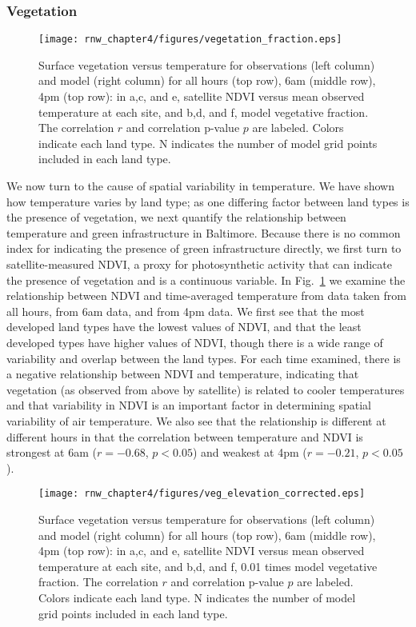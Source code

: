 \subsubsection{Vegetation}

\begin{figure}
\centering
\texttt{[image: rnw\_chapter4/figures/vegetation\_fraction.eps]}
\caption{Surface vegetation versus temperature for observations (left column) and model (right column) for all hours (top row), 6am (middle row), 4pm (top row): in a,c, and e, satellite NDVI versus mean observed temperature at each site, and b,d, and f, model vegetative fraction. The correlation $r$ and correlation p-value $p$ are labeled. Colors indicate each land type. N indicates the number of model grid points included in each land type.}
\label{fig:veg}
\end{figure}

We now turn to the cause of spatial variability in temperature. We have shown how temperature varies by land type; as one differing factor between land types is the presence of vegetation, we next quantify the relationship between temperature and green infrastructure in Baltimore. 
Because there is no common index for indicating the presence of green infrastructure directly, we first turn to satellite-measured NDVI, a proxy for photosynthetic activity that can indicate the presence of vegetation and is a continuous variable. 
In Fig.~\ref{fig:veg} we examine the relationship between NDVI and time-averaged temperature from data taken from all hours, from 6am data, and from 4pm data. We first see that the most developed land types have the lowest values of NDVI, and that the least developed types have higher values of NDVI, though there is a wide range of variability and overlap between the land types. For each time examined, there is a negative relationship between NDVI and temperature, indicating that vegetation (as observed from above by satellite) is related to cooler temperatures and  that variability in NDVI is an important factor in determining spatial variability of air temperature. We also see that the relationship is different at different hours in that the correlation between temperature and NDVI is strongest at 6am ($r = -0.68$, $p< 0.05$) and weakest at 4pm ($r= -0.21$, $p<0.05$). 

\begin{figure}
\centering
\texttt{[image: rnw\_chapter4/figures/veg\_elevation\_corrected.eps]}
\caption{Surface vegetation versus temperature for observations (left column) and model (right column) for all hours (top row), 6am (middle row), 4pm (top row): in a,c, and e, satellite NDVI versus mean observed temperature at each site, and b,d, and f, 0.01 times model vegetative fraction. The correlation $r$ and correlation p-value $p$ are labeled. Colors indicate each land type. N indicates the number of model grid points included in each land type.}
\label{fig:veg_elev_corrected}
\end{figure}

